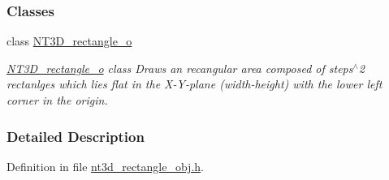 \subsubsection*{Classes}
\begin{DoxyCompactItemize}
\item 
class \hyperlink{class_n_t3_d__rectangle__o}{NT3D\_\-rectangle\_\-o}
\begin{DoxyCompactList}\small\item\em \hyperlink{class_n_t3_d__rectangle__o}{NT3D\_\-rectangle\_\-o} class Draws an recangular area composed of steps$^\wedge$2 rectanlges which lies flat in the X-\/Y-\/plane (width-\/height) with the lower left corner in the origin. \item\end{DoxyCompactList}\end{DoxyCompactItemize}


\subsubsection{Detailed Description}


Definition in file \hyperlink{nt3d__rectangle__obj_8h_source}{nt3d\_\-rectangle\_\-obj.h}.


